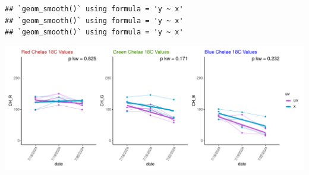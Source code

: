 \documentclass[
]{article}
\begin{document}
\begin{verbatim}
## `geom_smooth()` using formula = 'y ~ x'
## `geom_smooth()` using formula = 'y ~ x'
## `geom_smooth()` using formula = 'y ~ x'
\end{verbatim}

\includegraphics{color_analysis_pdf_files/figure-latex/Line Plots Example-1.pdf}
\end{document}
